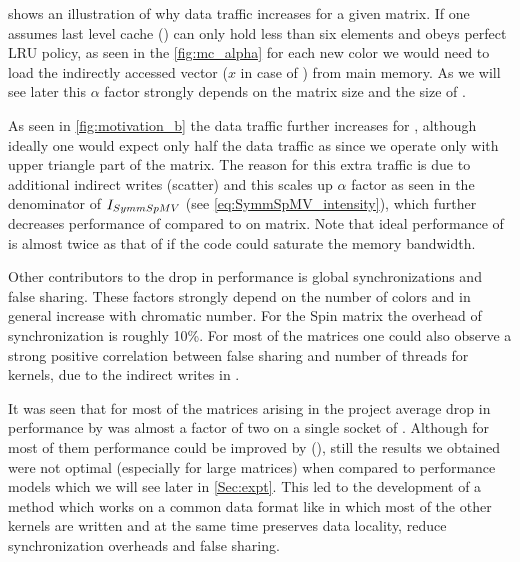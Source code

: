     shows an illustration of why data traffic increases for a given matrix. If one assumes last level cache (\LLC) can only hold less than six elements and obeys perfect LRU policy, as seen in the \cref{fig:mc_alpha} for  each new color we would need to load the indirectly accessed vector ($x$ in case of \SpMV) from main memory. As we will see later this $\alpha$ factor strongly depends on the matrix size and the size of \LLC.
  
 As seen in \cref{fig:motivation_b} the data traffic further increases for \SymmSpmv, although ideally one would expect only half the data traffic as \SpMV since we operate only with upper triangle part of the matrix. The reason for this extra traffic is due to additional indirect writes (scatter) and this scales up $\alpha$ factor as seen in the denominator of $I_{SymmSpMV}$ (see \cref{eq:SymmSpMV_intensity}),  which further decreases performance of \SymmSpmv compared to \SpMV on \MC matrix. Note that ideal performance of \SymmSpmv is almost twice as that of \SpMV if the code could saturate the memory bandwidth.
 
 Other contributors to the drop in performance is global synchronizations and false sharing. These factors strongly depend on the number of colors and in general increase with chromatic number. For the Spin matrix the overhead of synchronization is roughly 10\%.  For most of the matrices one could also observe a strong positive correlation between false sharing and number of threads for \SymmSpmv kernels, due to the indirect writes in \SymmSpmv.

It was seen that for most of the matrices arising in the project average drop in performance by \MCfull was almost a factor of two on a single socket of \IVB. Although for most of them performance could be improved by \ABMCfull (\ABMC), still the results we obtained were not optimal (especially for large matrices) when compared to performance models which we will see later in \cref{Sec:expt}. This led to the development of a method which works on a common data format like \CRS in which most of the other kernels are written and at the same time preserves data locality, reduce synchronization overheads and false sharing.
 

